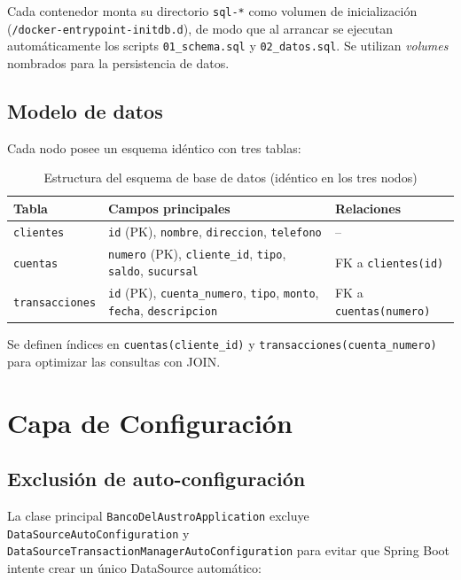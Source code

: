 \documentclass[12pt, a4paper]{article}
\begin{document}
Cada contenedor monta su directorio \texttt{sql-*} como volumen de inicialización (\texttt{/docker-entrypoint-initdb.d}), de modo que al arrancar se ejecutan automáticamente los scripts \texttt{01\_schema.sql} y \texttt{02\_datos.sql}. Se utilizan \textit{volumes} nombrados para la persistencia de datos.

\subsection{Modelo de datos}
Cada nodo posee un esquema idéntico con tres tablas:

\begin{table}[H]
\centering
\caption{Estructura del esquema de base de datos (idéntico en los tres nodos)}
\begin{tabular}{@{} l p{6.2cm} l @{}}
\toprule
\textbf{Tabla} & \textbf{Campos principales} & \textbf{Relaciones} \\
\midrule
\texttt{clientes} & \texttt{id} (PK), \texttt{nombre}, \texttt{direccion}, \texttt{telefono} & -- \\
\texttt{cuentas} & \texttt{numero} (PK), \texttt{cliente\_id}, \texttt{tipo}, \texttt{saldo}, \texttt{sucursal} & FK a \texttt{clientes(id)} \\
\texttt{transacciones} & \texttt{id} (PK), \texttt{cuenta\_numero}, \texttt{tipo}, \texttt{monto}, \texttt{fecha}, \texttt{descripcion} & FK a \texttt{cuentas(numero)} \\
\bottomrule
\end{tabular}
\end{table}

Se definen índices en \texttt{cuentas(cliente\_id)} y \texttt{transacciones(cuenta\_numero)} para optimizar las consultas con JOIN.

\section{Capa de Configuración}

\subsection{Exclusión de auto-configuración}
La clase principal \texttt{BancoDelAustroApplication} excluye \texttt{DataSourceAutoConfiguration} y \texttt{DataSourceTransactionManagerAutoConfiguration} para evitar que Spring Boot intente crear un único DataSource automático:
\end{document}
